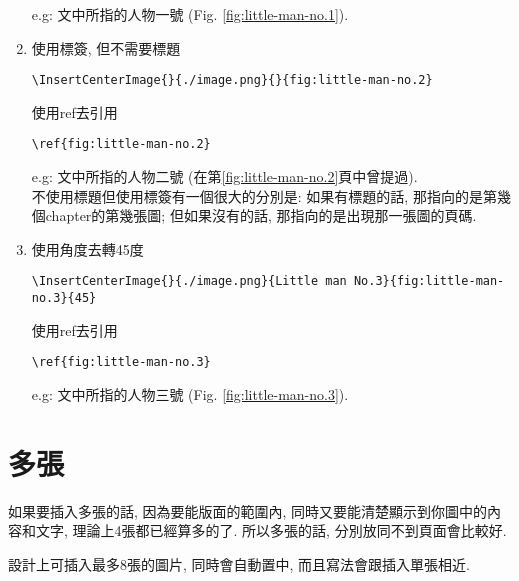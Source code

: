 \begin{enumerate}
{      e.g: 文中所指的人物一號 (Fig. \ref{fig:little-man-no.1}).
    } %

    \newpage

    \item
    {
      使用標簽, 但不需要標題\begin{verbatim}\InsertCenterImage{}{./image.png}{}{fig:little-man-no.2}\end{verbatim}
      使用ref去引用\begin{verbatim}\ref{fig:little-man-no.2}\end{verbatim}

      e.g: 文中所指的人物二號 (在第\ref{fig:little-man-no.2}頁中曾提過). \\

      不使用標題但使用標簽有一個很大的分別是: 如果有標題的話, 那指向的是第幾個chapter的第幾張圖; 但如果沒有的話, 那指向的是出現那一張圖的頁碼.
    } %

    \item
    {
      使用角度去轉45度\begin{verbatim}\InsertCenterImage{}{./image.png}{Little man No.3}{fig:little-man-no.3}{45}\end{verbatim}
      使用ref去引用\begin{verbatim}\ref{fig:little-man-no.3}\end{verbatim}


      e.g: 文中所指的人物三號 (Fig. \ref{fig:little-man-no.3}).
    } %

  \end{enumerate}

\newpage
\section{多張}

  如果要插入多張的話, 因為要能版面的範圍內, 同時又要能清楚顯示到你圖中的內容和文字, 理論上4張都已經算多的了. 所以多張的話, 分別放同不到頁面會比較好.

  設計上可插入最多8張的圖片, 同時會自動置中, 而且寫法會跟插入單張相近.

